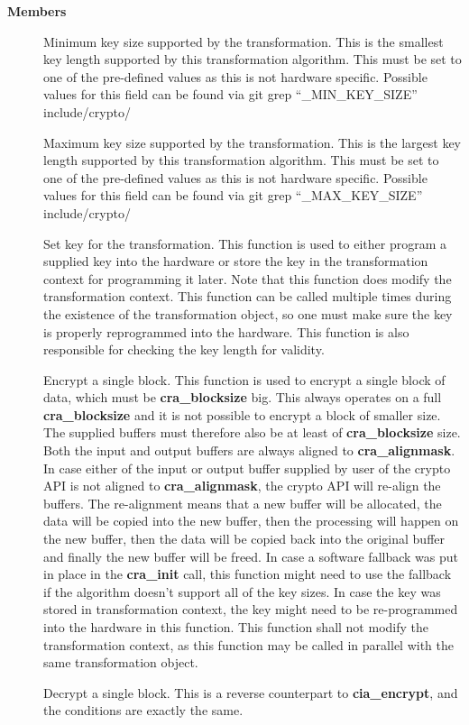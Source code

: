 \documentclass[a4paper,8pt,english]{sphinxmanual}
\begin{document}
\textbf{Members}
\begin{description}
\item[{}] \leavevmode
Minimum key size supported by the transformation. This is
the smallest key length supported by this transformation
algorithm. This must be set to one of the pre-defined
values as this is not hardware specific. Possible values
for this field can be found via git grep ``\_MIN\_KEY\_SIZE''
include/crypto/

\item[{}] \leavevmode
Maximum key size supported by the transformation. This is
the largest key length supported by this transformation
algorithm. This must be set to one of the pre-defined values
as this is not hardware specific. Possible values for this
field can be found via git grep ``\_MAX\_KEY\_SIZE''
include/crypto/

\item[{}] \leavevmode
Set key for the transformation. This function is used to either
program a supplied key into the hardware or store the key in the
transformation context for programming it later. Note that this
function does modify the transformation context. This function
can be called multiple times during the existence of the
transformation object, so one must make sure the key is properly
reprogrammed into the hardware. This function is also
responsible for checking the key length for validity.

\item[{}] \leavevmode
Encrypt a single block. This function is used to encrypt a
single block of data, which must be \textbf{cra\_blocksize} big. This
always operates on a full \textbf{cra\_blocksize} and it is not possible
to encrypt a block of smaller size. The supplied buffers must
therefore also be at least of \textbf{cra\_blocksize} size. Both the
input and output buffers are always aligned to \textbf{cra\_alignmask}.
In case either of the input or output buffer supplied by user
of the crypto API is not aligned to \textbf{cra\_alignmask}, the crypto
API will re-align the buffers. The re-alignment means that a
new buffer will be allocated, the data will be copied into the
new buffer, then the processing will happen on the new buffer,
then the data will be copied back into the original buffer and
finally the new buffer will be freed. In case a software
fallback was put in place in the \textbf{cra\_init} call, this function
might need to use the fallback if the algorithm doesn't support
all of the key sizes. In case the key was stored in
transformation context, the key might need to be re-programmed
into the hardware in this function. This function shall not
modify the transformation context, as this function may be
called in parallel with the same transformation object.

\item[{}] \leavevmode
Decrypt a single block. This is a reverse counterpart to
\textbf{cia\_encrypt}, and the conditions are exactly the same.

\end{description}
\end{document}
